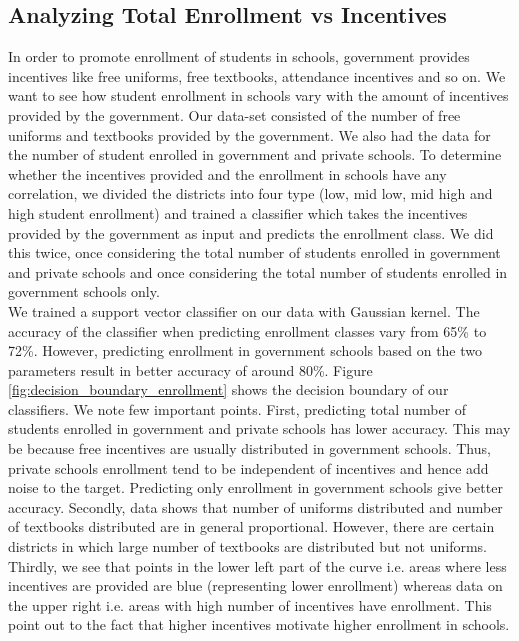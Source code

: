 \documentclass[twoside]{article}
\begin{document}
\subsection*{Analyzing Total Enrollment vs Incentives}
In order to promote enrollment of students in schools, government provides incentives like free uniforms, free textbooks, attendance incentives and so on. We want to see how student enrollment in schools vary with the amount of incentives provided by the government. Our data-set consisted of the number of free uniforms and textbooks provided by the government. We also had the data for the number of student enrolled in government and private schools. To determine whether the incentives provided and the enrollment in schools have any correlation, we divided the districts into four type (low, mid low, mid high and high student enrollment) and trained a classifier which takes the incentives provided by the government as input and predicts the enrollment class. We did this twice, once considering the total number of students enrolled in government and private schools and once considering the total number of students enrolled in government schools only.\\

We trained a support vector classifier on our data with Gaussian kernel. The accuracy of the classifier when predicting enrollment classes vary from 65\% to 72\%. However, predicting enrollment in government schools based on the two parameters result in better accuracy of around 80\%. Figure \ref{fig:decision_boundary_enrollment} shows the decision boundary of our classifiers. We note few important points. First, predicting total number of students enrolled in government and private schools has lower accuracy. This may be because free incentives are usually distributed in government schools. Thus, private schools enrollment tend to be independent of incentives and hence add noise to the target. Predicting only enrollment in government schools give better accuracy. Secondly, data shows that number of uniforms distributed and number of textbooks distributed are in general proportional. However, there are certain districts in which large number of textbooks are distributed but not uniforms. Thirdly, we see that points in the lower left part of the curve i.e. areas where less incentives are provided are blue (representing lower enrollment) whereas data on the upper right i.e. areas with high number of incentives have enrollment. This point out to the fact that higher incentives motivate higher enrollment in schools.
\end{document}
